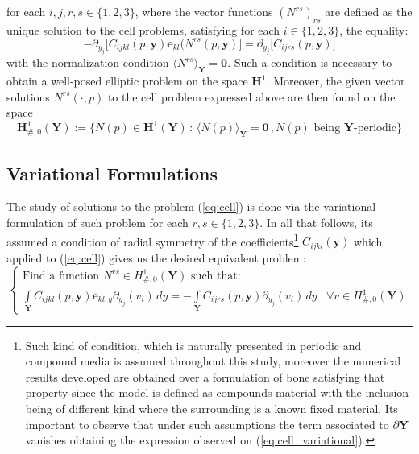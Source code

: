 for each $ i,j,r,s \in \{1,2,3\}$, where the vector functions $(N^{rs})_{rs}$ are defined as the unique solution to the cell problems, satisfying for each $i \in \{1,2,3\}$, the equality:
\begin{equation}
    \label{eq:cell}
    -\partial_{y_j} \big[ C_{ijkl}(p,\mathbf{y}) \mathbf{e}_{kl}(N^{rs}(p,\mathbf{y}) \big] = \partial_{y_j} \big[ C_{ijrs}(p,\mathbf{y}) \big] 
\end{equation}
with the normalization condition $\langle N^{rs} \rangle_{\mathbf{Y}} = \mathbf{0}$. Such a condition is necessary to obtain a well-posed elliptic problem on the space $\mathbf{H}^1$.
Moreover, the given vector solutions $N^{rs}(\cdot,p)$ to the cell problem expressed above are then found on the space
\begin{equation*}
    \mathbf{H}^1_{\#, 0} (\mathbf{Y}) := \big \{ N(p) \in  \mathbf{H}^1(\mathbf{Y}) \, : \, \langle N(p) \rangle_{\mathbf{Y}}=\mathbf{0} \,, N(p) \text{ being } \mathbf{Y}\text{-periodic} \big \}
\end{equation*}
\subsection{Variational Formulations}
The study of solutions to the problem (\ref{eq:cell}) is done via the variational formulation of such problem for each $r,s \in \{1,2,3\}$. In all that follows, its assumed a condition of radial symmetry of the coefficients\footnote{Such kind of condition, which is naturally presented in periodic and compound media is assumed throughout this study, moreover the numerical results developed are obtained over a formulation of bone satisfying that property since the model is defined as compounds material with the inclusion being of different kind where the surrounding is a known fixed material. Its important to observe that under such assumptions the term associated to $\partial \mathbf{Y}$ vanishes obtaining the expression observed on (\ref{eq:cell_variational}).} $C_{ijkl}(\mathbf{y})$ which applied to (\ref{eq:cell}) gives us the desired equivalent problem:
\begin{equation}
    \label{eq:cell_variational}
    \left \{
    \begin{array}{cc}
        \text{Find a function        } N^{rs} \in H^1_{\#,0}(\mathbf{Y}) \text{ such that: } & \quad \\
        \int\limits_{\mathbf{Y}} C_{ijkl}(p,\mathbf{y})\mathbf{e}_{kl,y} \partial_{y_j}(v_i)\,dy = -\int\limits_{\mathbf{Y}} C_{ijrs}(p, \mathbf{y}) \partial_{y_j}(v_i)\,dy &  \forall v \in H^1_{\#, 0}(\mathbf{Y})
    \end{array}
    \right.
\end{equation}

